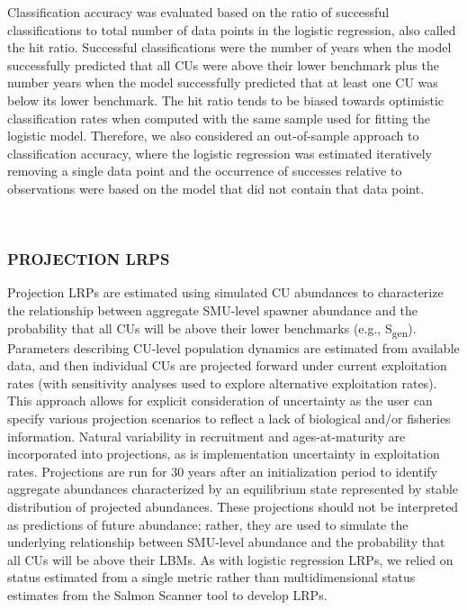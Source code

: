 \documentclass[
]{article}
\begin{document}
Classification accuracy was evaluated based on the ratio of successful
classifications to total number of data points in the logistic
regression, also called the hit ratio. Successful classifications were
the number of years when the model successfully predicted that all CUs
were above their lower benchmark plus the number years when the model
successfully predicted that at least one CU was below its lower
benchmark. The hit ratio tends to be biased towards optimistic
classification rates when computed with the same sample used for fitting
the logistic model. Therefore, we also considered an out-of-sample
approach to classification accuracy, where the logistic regression was
estimated iteratively removing a single data point and the occurrence of
successes relative to observations were based on the model that did not
contain that data point.

~

\hypertarget{projectedMethods}{%
\subsubsection{PROJECTION LRPS}\label{projectedMethods}}

Projection LRPs are estimated using simulated CU abundances to
characterize the relationship between aggregate SMU-level spawner
abundance and the probability that all CUs will be above their lower
benchmarks (e.g., S\textsubscript{gen}). Parameters describing CU-level
population dynamics are estimated from available data, and then
individual CUs are projected forward under current exploitation rates
(with sensitivity analyses used to explore alternative exploitation
rates). This approach allows for explicit consideration of uncertainty
as the user can specify various projection scenarios to reflect a lack
of biological and/or fisheries information. Natural variability in
recruitment and ages-at-maturity are incorporated into projections, as
is implementation uncertainty in exploitation rates. Projections are run
for 30 years after an initialization period to identify aggregate
abundances characterized by an equilibrium state represented by stable
distribution of projected abundances. These projections should not be
interpreted as predictions of future abundance; rather, they are used to
simulate the underlying relationship between SMU-level abundance and the
probability that all CUs will be above their LBMs. As with logistic
regression LRPs, we relied on status estimated from a single metric
rather than multidimensional status estimates from the Salmon Scanner
tool to develop LRPs.
\end{document}
